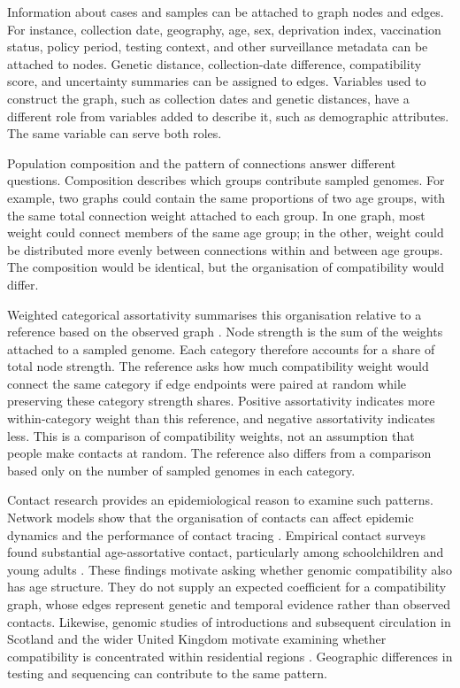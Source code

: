 Information about cases and samples can be attached to graph nodes and edges. For instance, collection date, geography, age, sex, deprivation index, vaccination status, policy period, testing context, and other surveillance metadata can be attached to nodes. Genetic distance, collection-date difference, compatibility score, and uncertainty summaries can be assigned to edges. Variables used to construct the graph, such as collection dates and genetic distances, have a different role from variables added to describe it, such as demographic attributes. The same variable can serve both roles.

Population composition and the pattern of connections answer different questions. Composition describes which groups contribute sampled genomes. For example, two graphs could contain the same proportions of two age groups, with the same total connection weight attached to each group. In one graph, most weight could connect members of the same age group; in the other, weight could be distributed more evenly between connections within and between age groups. The composition would be identical, but the organisation of compatibility would differ.

Weighted categorical assortativity summarises this organisation relative to a reference based on the observed graph \citep{Newman2002,Newman2003}. Node strength is the sum of the weights attached to a sampled genome. Each category therefore accounts for a share of total node strength. The reference asks how much compatibility weight would connect the same category if edge endpoints were paired at random while preserving these category strength shares. Positive assortativity indicates more within-category weight than this reference, and negative assortativity indicates less. This is a comparison of compatibility weights, not an assumption that people make contacts at random. The reference also differs from a comparison based only on the number of sampled genomes in each category.

Contact research provides an epidemiological reason to examine such patterns. Network models show that the organisation of contacts can affect epidemic dynamics and the performance of contact tracing \citep{Kiss2007}. Empirical contact surveys found substantial age-assortative contact, particularly among schoolchildren and young adults \citep{Mossong2008}. These findings motivate asking whether genomic compatibility also has age structure. They do not supply an expected coefficient for a compatibility graph, whose edges represent genetic and temporal evidence rather than observed contacts. Likewise, genomic studies of introductions and subsequent circulation in Scotland and the wider United Kingdom motivate examining whether compatibility is concentrated within residential regions \citep{daSilvaFilipe2020,duPlessis2021}. Geographic differences in testing and sequencing can contribute to the same pattern.

